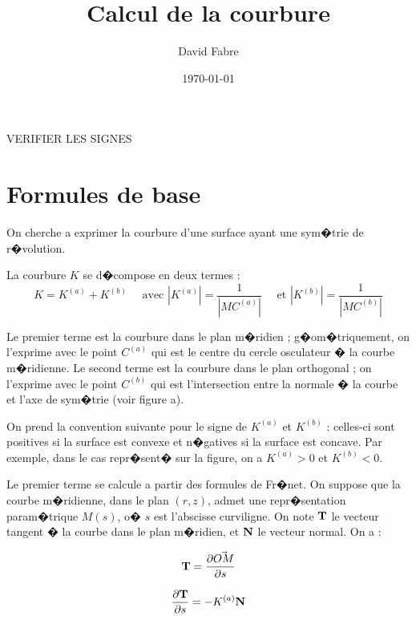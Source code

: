 \documentclass{jfm}
\title{Calcul de la courbure}
\author%
{
David Fabre
}
\date{\today}
\newcommand\DP[2]{\frac{\partial #1}{\partial #2}}
\begin{document}
\maketitle





VERIFIER LES SIGNES

\section{Formules de base}

\begin{figure}

\end{figure}

On cherche a exprimer la courbure d'une surface ayant une sym�trie de r�volution.

La courbure $K$ se d�compose en deux termes : 
$$
K = K^{(a)} + K^{(b)} 
\quad \mbox{ avec }  
\left| K^{(a)} \right|  = \frac{1}{| MC^{(a)} |} 
\quad \mbox{ et } 
\left| K^{(b)} \right| =  \frac{1}{| MC^{(b)} | }
$$

Le premier terme est la courbure dans le plan m�ridien ; g�om�triquement, on l'exprime avec le point  $C^{(a)}$ qui est le centre du cercle osculateur � la courbe m�ridienne. Le second terme est la courbure dans le plan orthogonal ; on l'exprime avec le point $C^{(b)}$ qui est l'intersection entre la normale � la courbe et l'axe de sym�trie (voir figure a).

On prend la convention suivante pour le signe de $K^{(a)}$ et  $K^{(b)}$ :
celles-ci sont positives si la surface est convexe et n�gatives si la surface est concave. Par exemple, dans le cas repr�sent� sur la figure, on a $K^{(a)}>0$ et  $K^{(b)}<0$.


Le premier terme se calcule a partir des formules de Fr�net.
On suppose que la courbe m�ridienne, dans le plan $(r,z)$, admet une repr�sentation param�trique $M(s)$, o� $s$ est l'abscisse curviligne. On note $\bf T$ le vecteur tangent � la courbe dans le plan m�ridien, et $\bf N$ le vecteur normal. On a : 

$$
{\bf T} = \DP{\vec{OM}}{s}
$$




$$
\DP{{\bf T}}{s} = - K^{(a)} {\bf N}
$$
\end{document}
